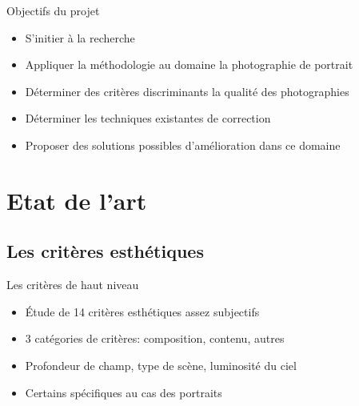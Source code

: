 \documentclass{beamer}
\begin{document}
\begin{frame}{Objectifs du projet}

\begin{itemize}
\item S'initier à la recherche
\item Appliquer la méthodologie au domaine la photographie de portrait
\item Déterminer des critères discriminants la qualité des photographies
\item Déterminer les techniques existantes de correction
\item Proposer des solutions possibles d'amélioration dans ce domaine
\end{itemize}

\end{frame}



\section{Etat de l'art}

\subsection{Les critères esthétiques}

\begin{frame}{Les critères de haut niveau}

\begin{itemize}
\item Étude de 14 critères esthétiques assez subjectifs
\item 3 catégories de critères: composition, contenu, autres
\item Profondeur de champ, type de scène, luminosité du ciel
\item Certains spécifiques au cas des portraits
\end{itemize}

\end{frame}
\end{document}
